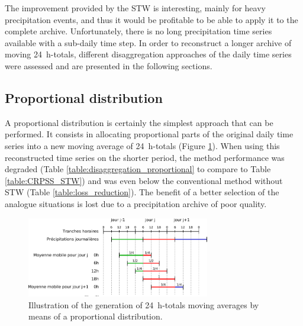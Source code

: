 \documentclass[hess]{copernicus}
\begin{document}
The improvement provided by the STW is interesting, mainly for heavy precipitation events, and thus it would be profitable to be able to apply it to the complete archive. Unfortunately, there is no long precipitation time series available with a sub-daily time step. In order to reconstruct a longer archive of moving 24~h-totals, different disaggregation approaches of the daily time series were assessed and are presented in the following sections.

\subsection{Proportional distribution}

A proportional distribution is certainly the simplest approach that can be performed. It consists in allocating proportional parts of the original daily time series into a new moving average of 24~h-totals (Figure \ref{fig:illustration_disaggregation}). When using this reconstructed time series on the shorter period, the method performance was degraded (Table \ref{table:disaggregation_proportional} to compare to Table \ref{table:CRPSS_STW}) and was even below the conventional method without STW (Table \ref{table:loss_reduction}). The benefit of a better selection of the analogue situations is lost due to a precipitation archive of poor quality.

\begin{figure}[htb]
	\begin{center}
		\includegraphics[width=8cm]{figures/illustration_disaggregation.pdf}
	\end{center}
	\caption{Illustration of the generation of 24~h-totals moving averages by means of a proportional distribution.}
	\label{fig:illustration_disaggregation}
\end{figure}
\end{document}
